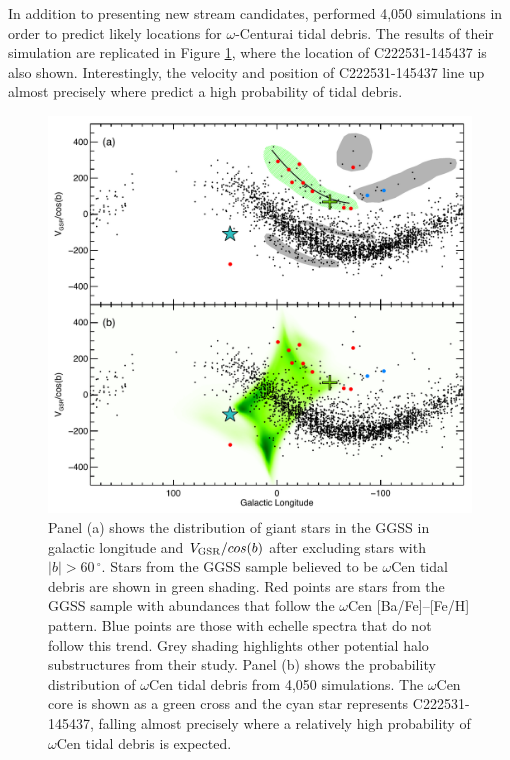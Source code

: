 \documentclass{emulateapj}
\begin{document}
In addition to presenting new stream candidates, \citet{majewski;et-al_2012} performed 4,050 simulations in order to predict likely locations for $\omega$-Centurai tidal debris. The results of their simulation are replicated in Figure \ref{fig:omega-cen-tidal-debris}, where the location of {C222531-145437} is also shown. Interestingly, the velocity and position of {C222531-145437} line up almost precisely where \citet{majewski;et-al_2012} predict a high probability of tidal debris. 

\begin{figure}[h!]
	\includegraphics[width=\columnwidth]{./figures/omegacen_tidaldebris.pdf}
	\caption{Panel (a) shows the distribution of giant stars in the GGSS \citep{majewski;et-al_2012} in galactic longitude and $V_{\rm GSR}/cos(b)$ after excluding stars with $|b| > 60\,^\circ$. Stars from the GGSS sample believed to be $\omega$Cen tidal debris are shown in green shading. Red points are stars from the GGSS sample with abundances that follow the $\omega$Cen [Ba/Fe]--[Fe/H] pattern. Blue points are those with echelle spectra that do not follow this trend. Grey shading highlights other potential halo substructures from their study. Panel (b) shows the probability distribution of $\omega$Cen tidal debris from 4,050 simulations.  The $\omega$Cen core is shown as a green cross and the cyan star represents {C222531-145437}, falling almost precisely where a relatively high probability of $\omega$Cen tidal debris is expected.}
	\label{fig:omega-cen-tidal-debris}
\end{figure}
\end{document}
